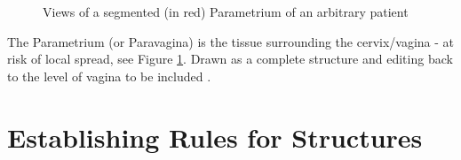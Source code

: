 \documentclass[11pt,twoside]{report}
\begin{document}
\begin{figure}[H]
  \caption{Views of a segmented (in red) Parametrium of an arbitrary patient}
  \label{fig:example-Parametrium}
\end{figure}

The Parametrium (or Paravagina) is the tissue surrounding the cervix/vagina - at risk of local spread, see Figure \ref{fig:example-Parametrium}. Drawn as a complete structure and editing back to the level of vagina to be included \cite{AMLART-data}.

\section{Establishing Rules for Structures}\label{sec:data-delineation-rules}
\end{document}
